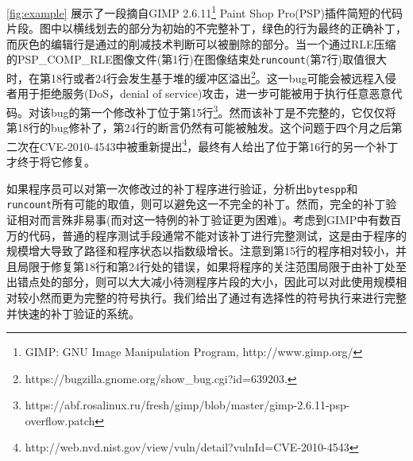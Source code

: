 \autoref{fig:example} 展示了一段摘自GIMP 2.6.11\footnote{GIMP: GNU Image Manipulation Program, http://www.gimp.org/} Paint Shop Pro(PSP)插件简短的代码片段。图中以横线划去的部分为初始的不完整补丁，绿色的行为最终的正确补丁，而灰色的编辑行是通过\dryrun 的削减技术判断可以被删除的部分。当一个通过RLE压缩的PSP\_COMP\_RLE图像文件(第1行)在图像结束处{\tt runcount}(第7行)取值很大时，在第18行或者24行会发生基于堆的缓冲区溢出\footnote{https://bugzilla.gnome.org/show\_bug.cgi?id=639203.}。这一bug可能会被远程入侵者用于拒绝服务(DoS，denial of service)攻击，进一步可能被用于执行任意恶意代码。对该bug的第一个修改补丁位于第15行\footnote{https://abf.rosalinux.ru/fresh/gimp/blob/master/gimp-2.6.11-psp-overflow.patch}。然而该补丁是不完整的，它仅仅将第18行的bug修补了，第24行的断言仍然有可能被触发。这个问题于四个月之后第二次在CVE-2010-4543中被重新提出\footnote{http://web.nvd.nist.gov/view/vuln/detail?vulnId=CVE-2010-4543}，最终有人给出了位于第16行的另一个补丁才终于将它修复。

如果程序员可以对第一次修改过的补丁程序进行验证，分析出\texttt{bytespp}和 \texttt{runcount}所有可能的取值，则可以避免这一不完全的补丁。然而，完全的补丁验证相对而言殊非易事(而对这一特例的补丁验证更为困难)。考虑到GIMP中有数百万的代码，普通的程序测试手段通常不能对该补丁进行完整测试，这是由于程序的规模增大导致了路径和程序状态以指数级增长。注意到第15行的程序相对较小，并且局限于修复第18行和第24行处的错误，如果将程序的关注范围局限于由补丁处至出错点处的部分，则可以大大减小待测程序片段的大小，因此可以对此使用规模相对较小然而更为完整的符号执行。我们给出了通过有选择性的符号执行来进行完整并快速的补丁验证的系统\dryrun 。

